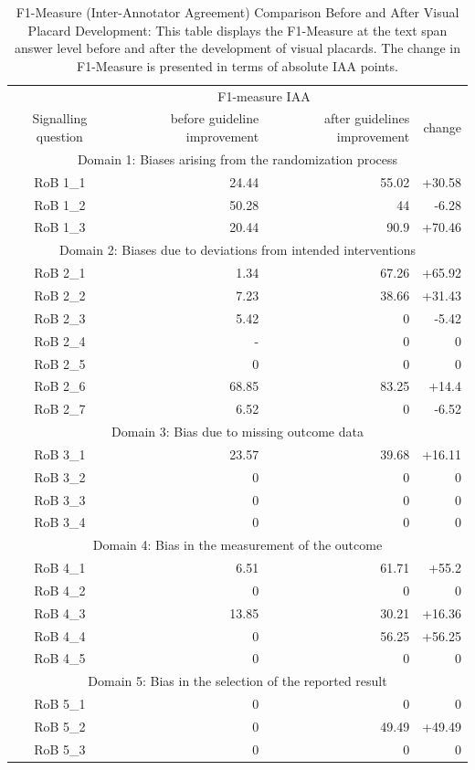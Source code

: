 \documentclass[sn-mathphys,Numbered]{sn-jnl}%
\theoremstyle{thmstyleone}%
\theoremstyle{thmstyletwo}%
\theoremstyle{thmstylethree}%
\begin{document}
\begin{table}[htb]
    \caption{F1-Measure (Inter-Annotator Agreement) Comparison Before and After Visual Placard Development: This table displays the F1-Measure at the text span answer level before and after the development of visual placards. The change in F1-Measure is presented in terms of absolute IAA points.}
    \label{tab:IAA_sq}
    \centering
    \begin{tabular}{crrr}
    \toprule[1.0pt]
         & \multicolumn{2}{c}{F1-measure IAA} & \\
        Signalling question & before guideline improvement & after guidelines improvement & change \\
    \midrule[1.0pt]
        \multicolumn{4}{c}{Domain 1: Biases arising from the randomization process} \\
        \hline
        RoB 1\_1 & 24.44 & 55.02 & +30.58 \\ 
        RoB 1\_2 & 50.28 & 44 & -6.28 \\ 
        RoB 1\_3 & 20.44 & 90.9 & +70.46 \\
        \hline
        \multicolumn{4}{c}{Domain 2: Biases due to deviations from intended interventions} \\
        \hline
        RoB 2\_1 & 1.34 & 67.26 & +65.92 \\ 
        RoB 2\_2 & 7.23 & 38.66 & +31.43 \\ 
        RoB 2\_3 & 5.42 & 0 & -5.42 \\ 
        RoB 2\_4 & - & 0 & 0 \\ 
        RoB 2\_5 & 0 & 0 & 0 \\ 
        RoB 2\_6 & 68.85 & 83.25 & +14.4 \\ 
        RoB 2\_7 & 6.52 & 0 & -6.52 \\ 
        \hline
        \multicolumn{4}{c}{Domain 3: Bias due to missing outcome data} \\
        \hline
        RoB 3\_1 & 23.57 & 39.68 & +16.11 \\ 
        RoB 3\_2 & 0 & 0 & 0 \\ 
        RoB 3\_3 & 0 & 0 & 0 \\ 
        RoB 3\_4 & 0 & 0 & 0 \\ 
        \hline
        \multicolumn{4}{c}{Domain 4: Bias in the measurement of the outcome} \\
        \hline
        RoB 4\_1 & 6.51 & 61.71 & +55.2 \\ 
        RoB 4\_2 & 0 & 0 & 0 \\ 
        RoB 4\_3 & 13.85 & 30.21 & +16.36 \\ 
        RoB 4\_4 & 0 & 56.25 & +56.25 \\ 
        RoB 4\_5 & 0 & 0 & 0 \\ 
        \hline
        \multicolumn{4}{c}{Domain 5: Bias in the selection of the reported result} \\
        \hline
        RoB 5\_1 & 0 & 0 & 0 \\ 
        RoB 5\_2 & 0 & 49.49 & +49.49 \\ 
        RoB 5\_3 & 0 & 0 & 0 \\
    \bottomrule[1.0pt]
    \end{tabular}
\end{table}
\end{document}
